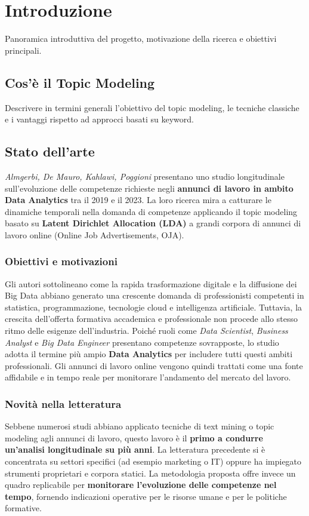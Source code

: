 \chapter{Introduzione}
Panoramica introduttiva del progetto, motivazione della ricerca e obiettivi principali.

\section{Cos'è il Topic Modeling}
Descrivere in termini generali l'obiettivo del topic modeling, le tecniche classiche e i vantaggi rispetto ad approcci basati su keyword.

\section{Stato dell'arte}

\textit{Almgerbi, De Mauro, Kahlawi, Poggioni} presentano uno studio longitudinale sull'evoluzione delle competenze richieste negli \textbf{annunci di lavoro in ambito Data Analytics} tra il 2019 e il 2023. 
La loro ricerca mira a catturare le dinamiche temporali nella domanda di competenze applicando il topic modeling basato su \textbf{Latent Dirichlet Allocation (LDA)} a grandi corpora di annunci di lavoro online (Online Job Advertisements, OJA).

\subsection{Obiettivi e motivazioni}
Gli autori sottolineano come la rapida trasformazione digitale e la diffusione dei Big Data abbiano generato una crescente domanda di professionisti competenti in statistica, programmazione, tecnologie cloud e intelligenza artificiale.
Tuttavia, la crescita dell'offerta formativa accademica e professionale non procede allo stesso ritmo delle esigenze dell'industria.
Poiché ruoli come \textit{Data Scientist}, \textit{Business Analyst} e \textit{Big Data Engineer} presentano competenze sovrapposte, lo studio adotta il termine più ampio \textbf{Data Analytics} per includere tutti questi ambiti professionali.
Gli annunci di lavoro online vengono quindi trattati come una fonte affidabile e in tempo reale per monitorare l'andamento del mercato del lavoro.

\subsection{Novità nella letteratura}
Sebbene numerosi studi abbiano applicato tecniche di text mining o topic modeling agli annunci di lavoro, questo lavoro è il \textbf{primo a condurre un'analisi longitudinale su più anni}.
La letteratura precedente si è concentrata su settori specifici (ad esempio marketing o IT) oppure ha impiegato strumenti proprietari e corpora statici.
La metodologia proposta offre invece un quadro replicabile per \textbf{monitorare l'evoluzione delle competenze nel tempo}, fornendo indicazioni operative per le risorse umane e per le politiche formative.

